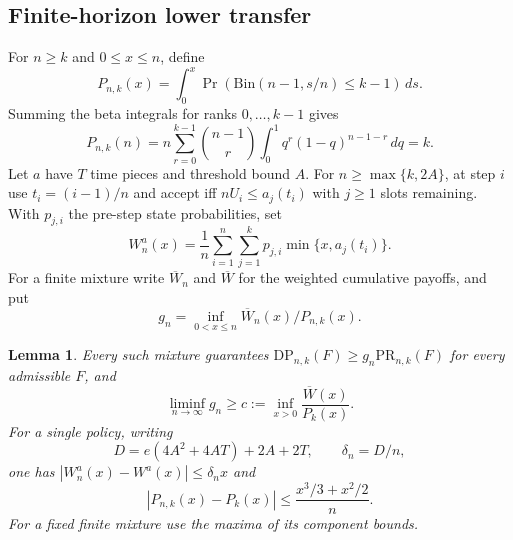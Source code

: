 \documentclass[11pt]{article}
\newtheorem{lemma}[theorem]{Lemma}
\theoremstyle{remark}
\begin{document}
\subsection{Finite-horizon lower transfer}

For $n\ge k$ and $0\le x\le n$, define
\[
 P_{n,k}(x)=\int_0^x\Pr(\mathrm{Bin}(n-1,s/n)\le k-1)\,ds.
\]
Summing the beta integrals for ranks $0,\ldots,k-1$ gives
\begin{equation}\label{eq:general-k-finite-tail}
 P_{n,k}(n)=n\sum_{r=0}^{k-1}\binom{n-1}{r}
 \int_0^1q^r(1-q)^{n-1-r}\,dq=k.
\end{equation}
Let $a$ have $T$ time pieces and threshold bound $A$. For
$n\ge\max\{k,2A\}$, at step $i$ use $t_i=(i-1)/n$ and accept iff
$nU_i\le a_j(t_i)$ with $j\ge1$ slots remaining. With $p_{j,i}$ the
pre-step state probabilities, set
\[
 W_n^a(x)=\frac1n\sum_{i=1}^n\sum_{j=1}^k
 p_{j,i}\min\{x,a_j(t_i)\}.
\]
For a finite mixture write $\overline W_n$ and $\overline W$ for the
weighted cumulative payoffs, and put
\[
g_n=\inf_{0<x\le n}\overline W_n(x)/P_{n,k}(x).
\]

\begin{lemma}\label{lem:general-k-lower-transfer}
Every such mixture guarantees
$\mathrm{DP}_{n,k}(F)\ge g_n\mathrm{PR}_{n,k}(F)$ for every admissible
$F$, and
\[
 \liminf_{n\to\infty}g_n\ge
 c:=\inf_{x>0}\frac{\overline W(x)}{P_k(x)}.
\]
For a single policy, writing
\[
 D=e(4A^2+4AT)+2A+2T,\qquad \delta_n=D/n,
\]
one has $|W_n^a(x)-W^a(x)|\le\delta_n x$ and
\begin{equation}\label{eq:general-k-benchmark-error}
 |P_{n,k}(x)-P_k(x)|\le\frac{x^3/3+x^2/2}{n}.
\end{equation}
For a fixed finite mixture use the maxima of its component bounds.
\end{lemma}
\end{document}
